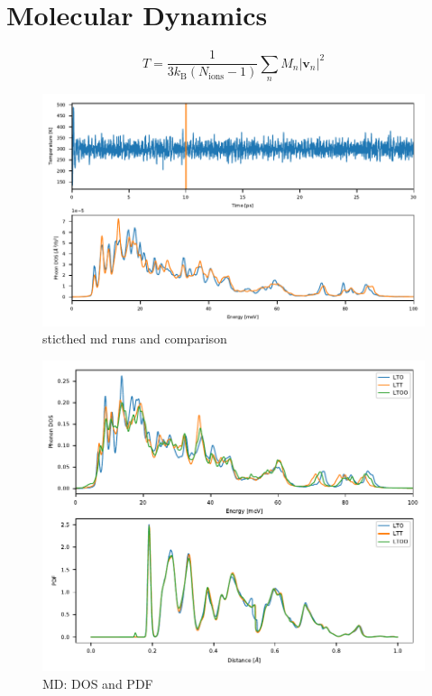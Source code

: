 \clearpage

\section{Molecular Dynamics}
\[ T = \frac{1}{3 k_\text{B} (N_\text{ions}-1)} \sum_n M_n |\bm{v}_n|^2 \]

\begin{figure}
	\centering
	\includegraphics[width=\textwidth]{fig/simulation/stitch.pdf}
	\caption[stitched md runs]{sticthed md runs and comparison}
	\label{fig:stitch}
\end{figure}

\begin{figure}
	\centering
	\includegraphics[width=\textwidth]{fig/simulation/md_dos_pdf.pdf}
	\caption[MD: DOS and PDF]{MD: DOS and PDF}
	\label{fig:dos_pdf}
\end{figure}

